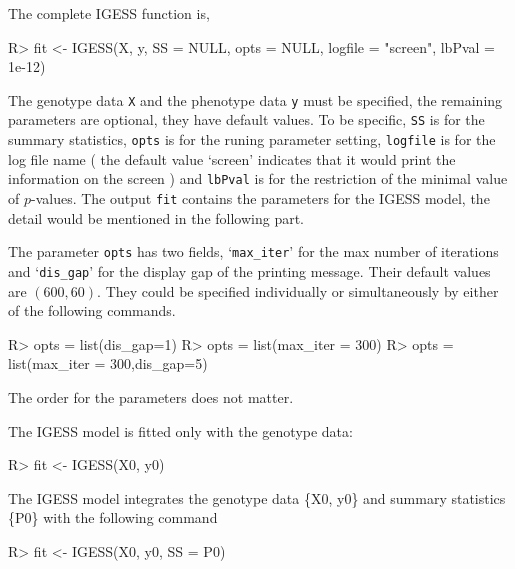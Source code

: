 \documentclass[11pt]{article}
\begin{document}
The complete IGESS function is,
\begin{Schunk}
\begin{Sinput}
R> fit <- IGESS(X, y, SS = NULL, opts = NULL, logfile = "screen", lbPval = 1e-12)
\end{Sinput}
\end{Schunk}

The genotype data \texttt{X} and the phenotype data \texttt{y} must be specified, the remaining parameters are optional, they have default values. To be specific, \texttt{SS} is for the summary statistics, \texttt{opts} is for the runing parameter setting, \texttt{logfile} is for the log file name ( the default value `screen' indicates that it would print the information on the screen ) and \texttt{lbPval} is for the restriction of the minimal value of $p$-values. The output \texttt{fit} contains the parameters for the IGESS model, the detail would be mentioned in the following part.

The parameter \texttt{opts} has two fields, `\texttt{max\_iter}' for the max number of iterations and `\texttt{dis\_gap}' for the display gap of the printing message. Their default values are $(600,60)$. They could be specified individually or simultaneously by either of the following commands.
\begin{Schunk}
\begin{Sinput}
R> opts = list(dis_gap=1)
R> opts = list(max_iter = 300)
R> opts = list(max_iter = 300,dis_gap=5)
\end{Sinput}
\end{Schunk}
The order for the parameters does not matter.


The IGESS model is fitted only with the genotype data:
\begin{Schunk}
\begin{Sinput}
R> fit <- IGESS(X0, y0)
\end{Sinput}
\end{Schunk}

The IGESS model integrates the genotype data \{X0, y0\} and summary statistics \{P0\} with the following command
\begin{Schunk}
\begin{Sinput}
R> fit <- IGESS(X0, y0, SS = P0)
\end{Sinput}
\end{Schunk}
\end{document}
